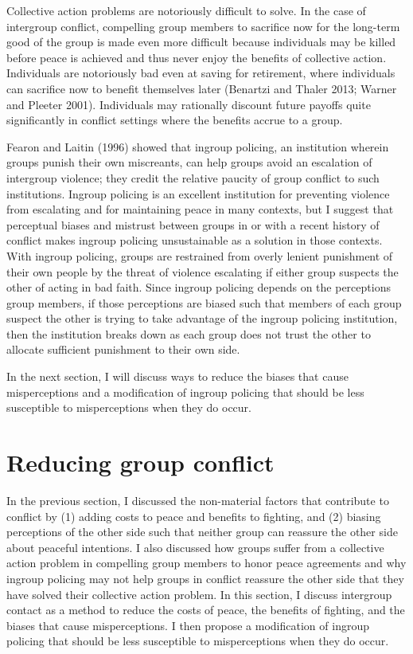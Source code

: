 \documentclass[11pt]{article}
\begin{document}
Collective action problems are notoriously difficult to solve. In the
case of intergroup conflict, compelling group members to sacrifice now
for the long-term good of the group is made even more difficult because
individuals may be killed before peace is achieved and thus never enjoy
the benefits of collective action. Individuals are notoriously bad even
at saving for retirement, where individuals can sacrifice now to benefit
themselves later (Benartzi and Thaler 2013; Warner and Pleeter 2001).
Individuals may rationally discount future payoffs quite significantly
in conflict settings where the benefits accrue to a group.

Fearon and Laitin (1996) showed that ingroup policing, an institution
wherein groups punish their own miscreants, can help groups avoid an
escalation of intergroup violence; they credit the relative paucity of
group conflict to such institutions. Ingroup policing is an excellent
institution for preventing violence from escalating and for maintaining
peace in many contexts, but I suggest that perceptual biases and
mistrust between groups in or with a recent history of conflict makes
ingroup policing unsustainable as a solution in those contexts. With
ingroup policing, groups are restrained from overly lenient punishment
of their own people by the threat of violence escalating if either group
suspects the other of acting in bad faith. Since ingroup policing
depends on the perceptions group members, if those perceptions are
biased such that members of each group suspect the other is trying to
take advantage of the ingroup policing institution, then the institution
breaks down as each group does not trust the other to allocate
sufficient punishment to their own side.

In the next section, I will discuss ways to reduce the biases that cause
misperceptions and a modification of ingroup policing that should be
less susceptible to misperceptions when they do occur.

\hypertarget{reducing-group-conflict}{%
\section{Reducing group conflict}\label{reducing-group-conflict}}

In the previous section, I discussed the non-material factors that
contribute to conflict by (1) adding costs to peace and benefits to
fighting, and (2) biasing perceptions of the other side such that
neither group can reassure the other side about peaceful intentions. I
also discussed how groups suffer from a collective action problem in
compelling group members to honor peace agreements and why ingroup
policing may not help groups in conflict reassure the other side that
they have solved their collective action problem. In this section, I
discuss intergroup contact as a method to reduce the costs of peace, the
benefits of fighting, and the biases that cause misperceptions. I then
propose a modification of ingroup policing that should be less
susceptible to misperceptions when they do occur.
\end{document}
